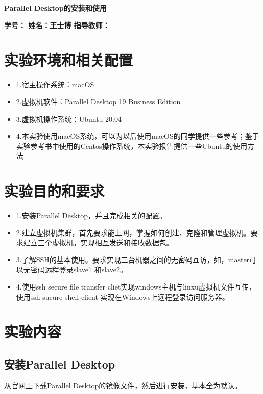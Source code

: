 \documentclass{article}
\begin{document}
 \pingfang
\begin{center}
\textbf{\huge Parallel Desktop的安装和使用}
\end{center}
\begin{center}
    \textbf{\large \textbf{学号： \quad 姓名：王士博 \quad 指导教师：}}
\end{center}
\hrulefill
\section{实验环境和相关配置}
\begin{itemize}
    \item 1.宿主操作系统：macOS
    \item 2.虚拟机软件：Parallel Desktop 19 Business Edition
    \item 3.虚拟机操作系统：Ubuntu 20.04
    \item 4.本实验使用macOS系统，可以为以后使用macOS的同学提供一些参考；鉴于实验参考书中使用的Centos操作系统，本实验报告提供一些Ubuntu的使用方法
\end{itemize}
\section{实验目的和要求}
\begin{itemize}
    \item 1.安装Parallel Desktop，并且完成相关的配置。
    \item 2.建立虚拟机集群，首先要求能上网，掌握如何创建、克隆和管理虚拟机。要求建立三个虚拟机，实现相互发送和接收数据包。
    \item 3.了解SSH的基本使用。要求实现三台机器之间的无密码互访，如，master可以无密码远程登录slave1 和slave2。
    \item 4.使用ssh secure file transfer cliet实现windows主机与linxu虚拟机文件互传，使用ssh sucure shell client 实现在Windows上远程登录访问服务器。
\end{itemize}
\section{实验内容}
\subsection{安装Parallel Desktop}
\indent 从官网上下载Parallel Desktop的镜像文件，然后进行安装，基本全为默认。
\end{document}
